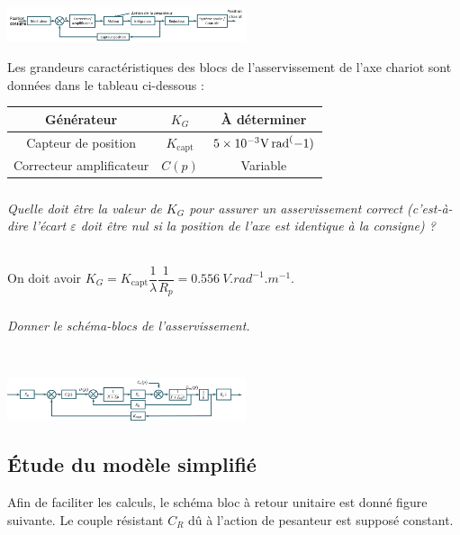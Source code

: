 \documentclass[10pt,fleqn]{article} %
\begin{document}
\begin{multicols}{2}
\begin{center}
\includegraphics[width=7cm]{images/image9}
\end{center} 

Les grandeurs caractéristiques des blocs de l'asservissement de l'axe chariot sont données dans le tableau ci-dessous :
\begin{center}
\begin{tabular}{|c|c|c|}
\hline
Générateur & $K_G$ & À déterminer \\
\hline
Capteur de position	& $K_\text{capt}$ & $\num{5d-3}\si{V.rad^(-1)}$ \\
\hline
Correcteur amplificateur	 & $C(p)$ & Variable \\
\hline
\end{tabular}
\end{center}
\fi

\subparagraph{}
\textit{Quelle doit être la valeur de $K_G$ pour assurer un asservissement correct (c'est-à-dire l'écart $\varepsilon$ doit être nul si la position de l'axe est identique à la consigne) ?}
\ifprof
\begin{corrige} ~\\

On doit avoir $K_G=K_{\text{capt}} \dfrac{1}{\lambda} \dfrac{1}{R_p}=\SI{0,556}{V.rad^{-1}.m^{-1}}$.
\end{corrige}
\else
\fi

\subparagraph{}
\textit{Donner le schéma-blocs de l'asservissement.}
\ifprof
\begin{corrige} ~\\

\begin{center}
\includegraphics[width=7cm]{images/corr_02}
\end{center} 

\end{corrige}
\else
\fi

\subsection*{Étude du modèle simplifié}
\ifprof
\else
Afin de faciliter les calculs, le schéma bloc à retour unitaire est donné figure suivante. Le couple résistant $C_R$ dû à l'action de pesanteur est supposé constant.
 

\end{multicols}
\end{document}
